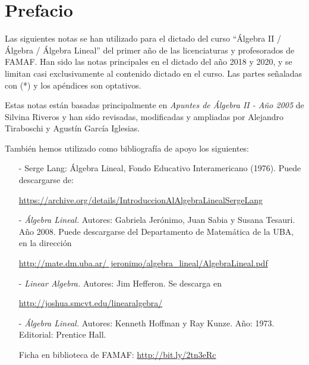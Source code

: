\documentclass[a4paper,12pt,twoside,spanish,reqno,dottedtoc]{scrbook}
\begin{document}
	
	
	 
	\pagestyle{scrheadings} %
	\cleardoublepage %
	\cleardoublepage
	

	
	\chapter*{Prefacio} 
	
	
	Las siguientes notas se han utilizado para el dictado del curso ``Álgebra II / Álgebra / Álgebra Lineal'' del primer año de las licenciaturas y profesorados de FAMAF. 	Han sido las notas principales en el dictado del año 2018 y 2020, y se limitan casi exclusivamente al contenido dictado en el curso. Las partes señaladas con (*) y los apéndices son optativos.
	
	Estas notas están basadas principalmente en \textit{Apuntes de Álgebra II - Año 2005} de Silvina Riveros y han sido revisadas, modificadas y ampliadas por Alejandro Tiraboschi  y Agustín García Iglesias. 
	
	También hemos utilizado como bibliografía de apoyo  los siguientes: 
	
	\begin{enumerate}

		\item [-]  Serge Lang: Álgebra Lineal, Fondo Educativo Interamericano (1976). Puede descargarse de:
 
		\href{https://archive.org/details/IntroduccionAlAlgebraLinealSergeLang}{https://archive.org/details/IntroduccionAlAlgebraLinealSergeLang}

	
		\item [-] \textit{Álgebra Lineal.} Autores: Gabriela Jerónimo, Juan Sabia y Susana Tesauri. Año 2008. Puede descargarse del Departamento de Matemática de la UBA, en la dirección
		
		\href{http://mate.dm.uba.ar/~jeronimo/algebra_lineal/AlgebraLineal.pdf}{http://mate.dm.uba.ar/~jeronimo/algebra\_lineal/AlgebraLineal.pdf}

		\item [- ] \textit{Linear Algebra.} Autores: Jim Hefferon. Se descarga en
		
		\href{http://joshua.smcvt.edu/linearalgebra/}{http://joshua.smcvt.edu/linearalgebra/}

		\item [-] \textit{Álgebra Lineal.} Autores: Kenneth Hoffman y Ray Kunze.  Año: 1973. Editorial: Prentice Hall. 
		
		Ficha en biblioteca de FAMAF:  \href{http://bit.ly/2tn3eRc}{http://bit.ly/2tn3eRc}
	\end{enumerate}
	
\end{document}
